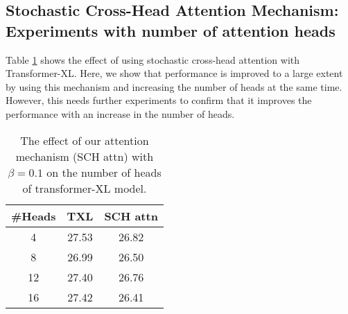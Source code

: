 \documentclass[11pt]{article}
\begin{document}
\subsection{Stochastic Cross-Head Attention Mechanism: Experiments with number of attention heads}


Table \ref{table:headwt103} shows the effect of using stochastic cross-head attention with Transformer-XL. Here, we show that performance is improved to a large extent by using this mechanism and increasing the number of heads at the same time. However, this needs further experiments to confirm that it improves the performance with an increase in the number of heads.



\begin{table}
\centering
\begin{tabular}{ccc}
\hline \textbf{\#Heads} & \textbf{TXL} & \textbf{SCH attn} \\ \hline
4  & 27.53 & 26.82\\

8 & 26.99 &  26.50 \\
12  &  27.40 & 26.76 \\
16 &  27.42 & 26.41 \\
\hline
\end{tabular}
\caption{ The effect of our attention mechanism (SCH attn) with $\beta=0.1$ on the number of heads of transformer-XL model.}
\label{table:headwt103}
\end{table}
\end{document}
